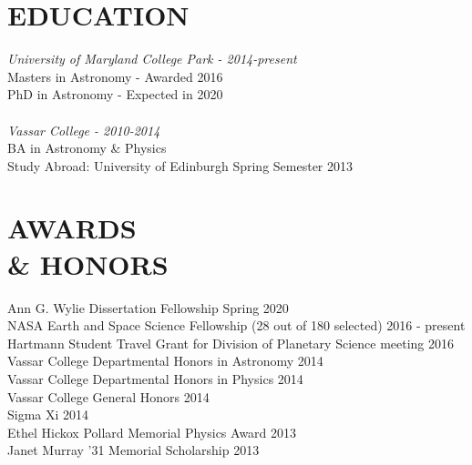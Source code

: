 \documentclass[line,margin]{res}
\begin{document}
\address{Phone: (516) 286-5149 $\bullet$ Email: zero@astro.umd.edu}

 
\begin{resume}

 
\section{EDUCATION} 
{\sl University of Maryland College Park - 2014-present} \\
				Masters in Astronomy - Awarded 2016\\
				PhD in Astronomy - Expected in 2020\\\\
{\sl Vassar College - 2010-2014} \\
                BA in Astronomy \& Physics\\
              Study Abroad: University of Edinburgh \hfill Spring Semester 2013
 
\section{AWARDS \\ \& HONORS}
Ann G. Wylie Dissertation Fellowship \hfill Spring 2020 \\
NASA Earth and Space Science Fellowship (28 out of 180 selected) \hfill 2016 - present\\
Hartmann Student Travel Grant for Division of Planetary Science meeting	\hfill 2016\\
{ Vassar College Departmental Honors in Astronomy} \hfill 2014\\
{ Vassar College Departmental Honors in Physics} \hfill 2014\\
{ Vassar College General Honors} \hfill 2014\\     
{ Sigma Xi} \hfill 2014\\ 
{ Ethel Hickox Pollard Memorial Physics Award} \hfill 2013 \\                 
{ Janet Murray '31 Memorial Scholarship} \hfill 2013
 

\end{resume}
\end{document}
